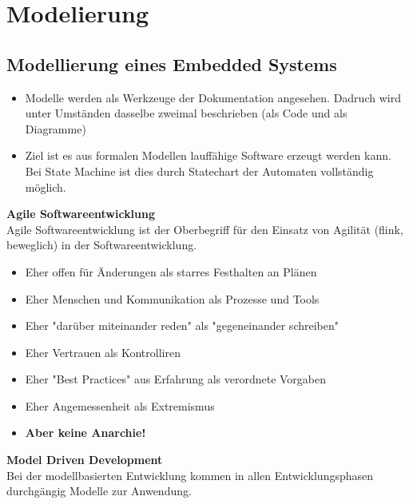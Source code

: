 \section{Modelierung }
\subsection{Modellierung eines Embedded Systems}

\begin{itemize}
	\item Modelle werden als Werkzeuge der Dokumentation angesehen. Dadruch 
	wird unter Umständen dasselbe zweimal beschrieben (als Code und als Diagramme)
	
	\item Ziel ist es aus formalen Modellen lauffähige Software erzeugt werden kann. Bei 
	State Machine ist dies durch Statechart der Automaten vollständig möglich.
\end{itemize}

\textbf{Agile Softwareentwicklung}\\
Agile Softwareentwicklung ist der Oberbegriff für den Einsatz von Agilität (flink, beweglich) in der Softwareentwicklung.
\begin{itemize}
	\item Eher offen für Änderungen als starres Festhalten an Plänen
	\item Eher Menschen und Kommunikation als Prozesse und Tools
	\item Eher "darüber miteinander reden" als "gegeneinander schreiben"
	\item Eher Vertrauen als Kontrolliren
	\item Eher "Best Practices" aus Erfahrung als verordnete Vorgaben
	\item Eher Angemessenheit als Extremismus
	\item \textbf{Aber keine Anarchie!}
\end{itemize}

\textbf{Model Driven Development}\\
Bei der modellbasierten Entwicklung kommen in allen Entwicklungsphasen durchgängig Modelle zur Anwendung.\\\\

